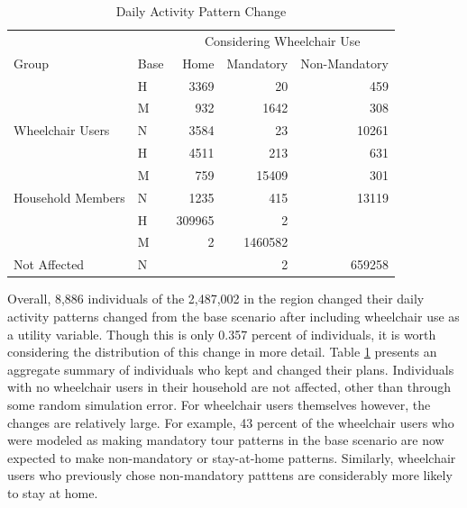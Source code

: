 \documentclass[3p, authoryear, review]{elsarticle} %
\begin{document}
\begin{table}

\caption{\label{tab:dap-summary}Daily Activity Pattern Change}
\centering
\begin{tabular}[t]{llrrr}
\toprule
\multicolumn{1}{c}{} & \multicolumn{1}{c}{} & \multicolumn{3}{c}{Considering Wheelchair Use} \\
\cmidrule(l{3pt}r{3pt}){3-5}
Group & Base & Home & Mandatory & Non-Mandatory\\
\midrule
 & H & 3369 & 20 & 459\\

 & M & 932 & 1642 & 308\\

\multirow{-3}{*}{\raggedright\arraybackslash Wheelchair Users} & N & 3584 & 23 & 10261\\
\cmidrule{1-5}
 & H & 4511 & 213 & 631\\

 & M & 759 & 15409 & 301\\

\multirow{-3}{*}{\raggedright\arraybackslash Household Members} & N & 1235 & 415 & 13119\\
\cmidrule{1-5}
 & H & 309965 & 2 & \\

 & M & 2 & 1460582 & \\

\multirow{-3}{*}{\raggedright\arraybackslash Not Affected} & N &  & 2 & 659258\\
\bottomrule
\end{tabular}
\end{table}

Overall, 8,886 individuals of the 2,487,002
in the region changed their daily activity patterns changed from the base
scenario after including wheelchair use as a utility variable.
Though this is only 0.357 percent of individuals, it is worth
considering the distribution of this change in more detail. Table
\ref{tab:dap-summary} presents an aggregate summary of individuals who kept and
changed their plans. Individuals with no wheelchair users in their household are
not affected, other than through some random simulation error. For wheelchair users
themselves however, the changes are relatively large.
For example, 43 percent of the wheelchair users who were modeled as
making mandatory tour patterns in the base scenario are now expected to make
non-mandatory or stay-at-home patterns. Similarly, wheelchair users who previously
chose non-mandatory patttens are considerably more likely to stay at home.
\end{document}
